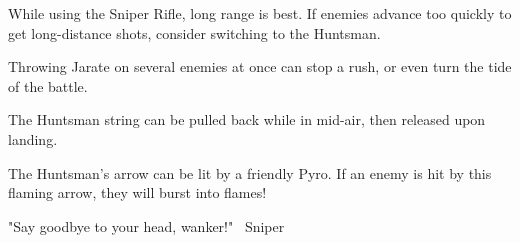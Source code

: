 While using the Sniper Rifle, long range is best. If enemies advance too quickly to get long-distance shots, consider switching to the Huntsman.

Throwing Jarate on several enemies at once can stop a rush, or even turn the tide of the battle.

The Huntsman string can be pulled back while in mid-air, then released upon landing.

The Huntsman's arrow can be lit by a friendly Pyro. If an enemy is hit by this flaming arrow, they will burst into flames!

"Say goodbye to your head, wanker!" ~Sniper
